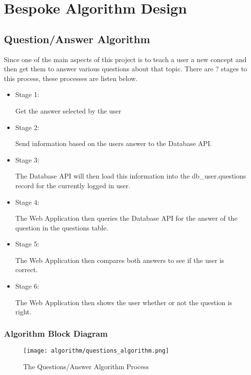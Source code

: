 \section{Bespoke Algorithm Design}

\subsection{Question/Answer Algorithm}

Since one of the main aspects of this project is to teach a user a new concept and then get them to answer various questions about that topic. There are {?} stages to this process, these processes are listen below.

\begin{itemize}
    \item{Stage 1: 

            Get the answer selected by the user}
    \item{Stage 2: 

            Send information based on the users answer to the Database API.}
    \item{Stage 3: 

            The Database API will then load this information into the db_user.questions record for the currently
            logged in user.}
    \item{Stage 4: 

            The Web Application then queries the Database API for the answer of the question in the questions table.}
    \item{Stage 5:

            The Web Application then compares both answers to see if the user is correct.}
    \item{Stage 6:

            The Web Application then shows the user whether or not the question is right.}
\end{itemize}

\subsubsection{Algorithm Block Diagram}

\begin{figure}[H]
\begin{center}
\texttt{[image: algorithm/questions\_algorithm.png]}
\end{center}
\caption{The Questions/Answer Algorithm Process}
\label{questions_algorithm}
\end{figure}

